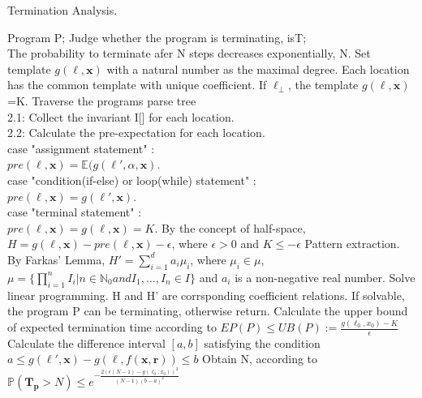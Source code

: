 \documentclass[sigconf,review, anonymous]{acmart}
\begin{document}
\begin{algorithm}[htb]  
	\caption{Termination Analysis.}  
	\label{TA}  
	\begin{algorithmic}[1]  
		\REQUIRE 
		Program P; 
		\ENSURE  
		Judge whether the program is terminating, isT;\\
		The probability to terminate afer N steps decreases exponentially, N.
		\STATE Set template $g(\ell,\boldsymbol{x})$ with a natural number as the maximal degree. Each location has the common template with unique coefficient. If $\ell_{\bot}$, the template $g(\ell,\boldsymbol{x})$=K.
		\STATE Traverse the programs parse tree \\
		2.1: Collect the invariant I[] for each location.\\
		2.2: Calculate the pre-expectation for each location.\\
		\quad \quad case "assignment statement" :\\
		\quad \quad \quad \quad $pre(\ell,\boldsymbol{x})= \mathbb{E}(g(\ell',\alpha,\boldsymbol{x})$.\\
		\quad \quad case "condition(if-else) or loop(while) statement" :\\
		\quad \quad \quad \quad $pre(\ell,\boldsymbol{x})=g(\ell',\boldsymbol{x})$.\\
		\quad \quad case "terminal statement" :\\
		\quad \quad \quad \quad $pre(\ell,\boldsymbol{x})=g(\ell,\boldsymbol{x})=K$.
		\STATE By the concept of half-space, $H=g(\ell,\boldsymbol{x})-pre(\ell,\boldsymbol{x})-\epsilon$, where $\epsilon >0$ and $K \leq -\epsilon$
		\STATE Pattern extraction. By Farkas' Lemma, $H'=\sum\limits_{i=1}^{d} a_i \mu_i$, where $\mu_i \in \mu$, $\mu=\{\prod\limits_{i=1}^{n} I_i | n\in\mathbb{N}_0 and I_1,\dots,I_n \in I\}$ and $a_i$ is a non-negative real number.
		\STATE Solve linear programming. H and H' are corrsponding coefficient relations. If solvable, the program P can be terminating, otherwise return.
		\STATE Calculate the upper bound of expected termination time according to $EP(P)\leq UB(P):=\frac{g(\ell_0,x_0)-K}{\epsilon}$
		\STATE Calculate the difference interval $[a,b]$ satisfying the condition $a\leq g(\ell',\boldsymbol{x})-g(\ell,f(\boldsymbol{x},\boldsymbol{r}))\leq b$
		\STATE Obtain N, according to $\mathbb{P}(\bm{T_p} > N) \leq e^{-\frac{2(\epsilon(N-1)-g(\ell_0,x_0))^2}{(N-1)(b-a)^2}}$
	\end{algorithmic}  
\end{algorithm}  
\end{document}
